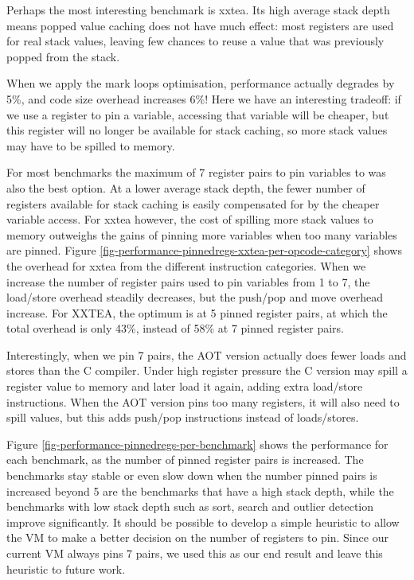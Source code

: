 Perhaps the most interesting benchmark is xxtea. Its high average stack depth means popped value caching does not have much effect: most registers are used for real stack values, leaving few chances to reuse a value that was previously popped from the stack. 

When we apply the mark loops optimisation, performance actually degrades by 5\%, and code size overhead increases 6\%! Here we have an interesting tradeoff: if we use a register to pin a variable, accessing that variable will be cheaper, but this register will no longer be available for stack caching, so more stack values may have to be spilled to memory.

For most benchmarks the maximum of 7 register pairs to pin variables to was also the best option. At a lower average stack depth, the fewer number of registers available for stack caching is easily compensated for by the cheaper variable access. For xxtea however, the cost of spilling more stack values to memory outweighs the gains of pinning more variables when too many variables are pinned. Figure \ref{fig-performance-pinnedregs-xxtea-per-opcode-category} shows the overhead for xxtea from the different instruction categories. When we increase the number of register pairs used to pin variables from 1 to 7, the load/store overhead steadily decreases, but the push/pop and move overhead increase. For XXTEA, the optimum is at 5 pinned register pairs, at which the total overhead is only 43\%, instead of 58\% at 7 pinned register pairs.

Interestingly, when we pin 7 pairs, the AOT version actually does fewer loads and stores than the C compiler. Under high register pressure the C version may spill a register value to memory and later load it again, adding extra load/store instructions. When the AOT version pins too many registers, it will also need to spill values, but this adds push/pop instructions instead of loads/stores.

Figure \ref{fig-performance-pinnedregs-per-benchmark} shows the performance for each benchmark, as the number of pinned register pairs is increased. The benchmarks stay stable or even slow down when the number pinned pairs is increased beyond 5 are the benchmarks that have a high stack depth, while the benchmarks with low stack depth such as sort, search and outlier detection improve significantly. It should be possible to develop a simple heuristic to allow the VM to make a better decision on the number of registers to pin. Since our current VM always pins 7 pairs, we used this as our end result and leave this heuristic to future work.

